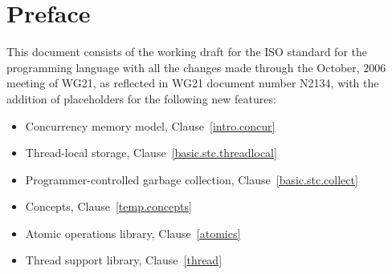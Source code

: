 \chapter*{Preface}

This document consists of the working draft for the ISO standard for the
programming language \Cpp
with all the changes made through
the October, 2006 meeting of WG21, as reflected in WG21 document number N2134,
with the addition of placeholders for the following new features:

\begin{itemize}
\item Concurrency memory model, Clause~\ref{intro.concur}
\item Thread-local storage, Clause~\ref{basic.stc.threadlocal}
\item Programmer-controlled garbage collection, Clause~\ref{basic.stc.collect}
\item Concepts, Clause~\ref{temp.concepts}
\item Atomic operations library, Clause~\ref{atomics}
\item Thread support library, Clause~\ref{thread}
\end{itemize}
